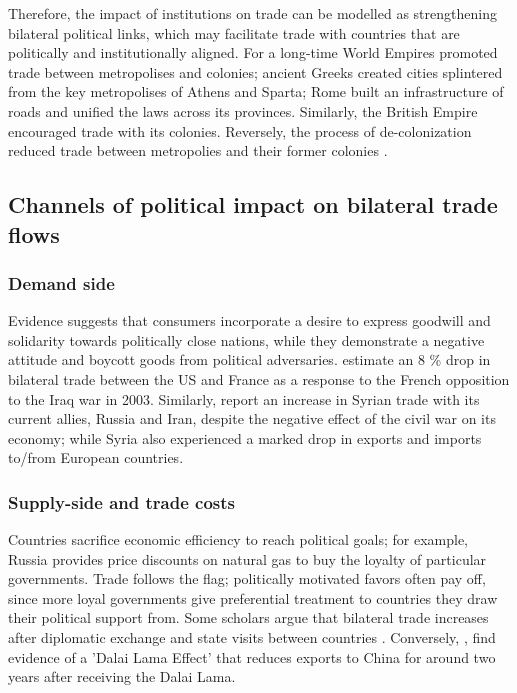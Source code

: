 Therefore, the impact of institutions on trade can be modelled as strengthening bilateral political links, which may facilitate trade with countries that are politically and institutionally aligned. For a long-time World Empires promoted trade between metropolises and colonies; ancient Greeks created cities splintered from the key metropolises of Athens and Sparta; Rome built an infrastructure of roads and unified the laws across its provinces. Similarly, the British Empire encouraged trade with its colonies. Reversely, the process of de-colonization reduced trade between metropolies and their former colonies \citep{head2010erosion}. 


\subsection{Channels of political impact on bilateral trade flows}

\subsubsection*{Demand side}

Evidence suggests that consumers incorporate a desire to express goodwill and solidarity towards politically close nations, while they demonstrate a negative attitude and boycott goods from political adversaries.  \cite{Michaels2010FreedomFries} estimate an 8 \% drop in bilateral trade between the US and France as a response to the French opposition to the Iraq war in 2003. Similarly, \cite{yazigi2014syria} report an increase in Syrian trade with its current allies, Russia and Iran, despite the negative effect of the civil war on its economy; while Syria also experienced a marked drop in exports and imports to/from European countries.

\subsubsection*{Supply-side and trade costs}

Countries sacrifice economic efficiency to reach political goals; for example, Russia provides price discounts on natural gas to buy the loyalty of particular governments.  Trade follows the flag; politically motivated favors often pay off, since more loyal governments give preferential treatment to countries they draw their political support from. Some scholars argue that bilateral trade increases after diplomatic exchange \citep{rose2007foreign} and state visits between countries \citep{nitsch2007state}. Conversely, \cite{Fuchs2013PayingTrade}, find evidence of a 'Dalai Lama Effect' that reduces exports to China for around two years after receiving the Dalai Lama.  

